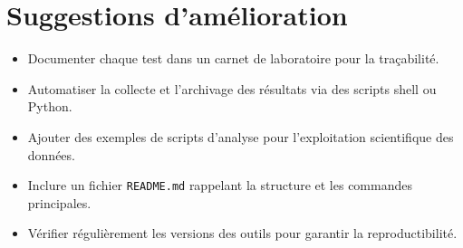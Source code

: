 \documentclass[a4paper,12pt]{article}
\begin{document}
\vspace{1em}

\section{Suggestions d’amélioration}
\begin{itemize}
    \item Documenter chaque test dans un carnet de laboratoire pour la traçabilité.
    \item Automatiser la collecte et l’archivage des résultats via des scripts shell ou Python.
    \item Ajouter des exemples de scripts d’analyse pour l’exploitation scientifique des données.
    \item Inclure un fichier \texttt{README.md} rappelant la structure et les commandes principales.
    \item Vérifier régulièrement les versions des outils pour garantir la reproductibilité.
\end{itemize}
\end{document}
